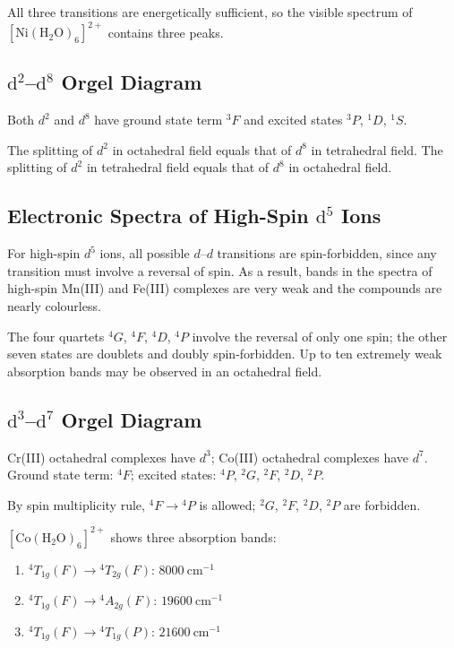\documentclass[12pt,a4paper]{article}
\begin{document}
All three transitions are energetically sufficient, so the visible spectrum of $[\mathrm{Ni(H_2O)_6}]^{2+}$ contains three peaks.

\subsection{$\mathrm{d}^2$--$\mathrm{d}^8$ Orgel Diagram}

Both $d^2$ and $d^8$ have ground state term ${}^3F$ and excited states ${}^3P$, ${}^1D$, ${}^1S$.

The splitting of $d^2$ in octahedral field equals that of $d^8$ in tetrahedral field. The splitting of $d^2$ in tetrahedral field equals that of $d^8$ in octahedral field.

\subsection{Electronic Spectra of High-Spin $\mathrm{d}^5$ Ions}

For high-spin $d^5$ ions, all possible $d$--$d$ transitions are spin-forbidden, since any transition must involve a reversal of spin. As a result, bands in the spectra of high-spin Mn(III) and Fe(III) complexes are very weak and the compounds are nearly colourless.

The four quartets ${}^4G$, ${}^4F$, ${}^4D$, ${}^4P$ involve the reversal of only one spin; the other seven states are doublets and doubly spin-forbidden. Up to ten extremely weak absorption bands may be observed in an octahedral field.

\subsection{$\mathrm{d}^3$--$\mathrm{d}^7$ Orgel Diagram}

Cr(III) octahedral complexes have $d^3$; Co(III) octahedral complexes have $d^7$. Ground state term: ${}^4F$; excited states: ${}^4P$, ${}^2G$, ${}^2F$, ${}^2D$, ${}^2P$.

By spin multiplicity rule, ${}^4F \to {}^4P$ is allowed; ${}^2G$, ${}^2F$, ${}^2D$, ${}^2P$ are forbidden.

\textbf{$[\mathrm{Co(H_2O)_6}]^{2+}$} shows three absorption bands:
\begin{enumerate}
  \item ${}^4T_{1g}(F) \to {}^4T_{2g}(F)$: $8000\ \mathrm{cm}^{-1}$
  \item ${}^4T_{1g}(F) \to {}^4A_{2g}(F)$: $19600\ \mathrm{cm}^{-1}$
  \item ${}^4T_{1g}(F) \to {}^4T_{1g}(P)$: $21600\ \mathrm{cm}^{-1}$
\end{enumerate}
\end{document}
